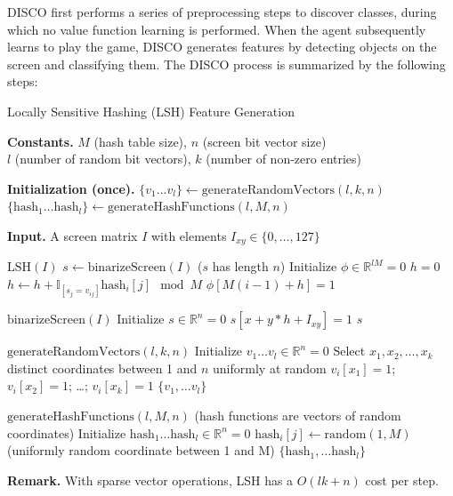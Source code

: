 \documentclass[twoside,11pt]{article}
\newcommand{\bR}{\mathbb{R}}
\newcommand{\indic}[1]{\mathbb{I}_{[#1]}}
\begin{document}
DISCO first performs a series of preprocessing steps to discover classes,
during which no value function learning is performed. When the agent subsequently learns 
to play the game, DISCO generates features by detecting objects on the screen and classifying them. 
The DISCO process is summarized by the following steps:

\begin{algorithm}
\caption{Locally Sensitive Hashing (LSH) Feature Generation\label{algo:lsh_feature_generation}}
\begin{algorithmic}
\item[\textbf{Constants.}] $M$ (hash table size), $n$ (screen bit vector size) \\
  $l$ (number of random bit vectors), $k$ (number of non-zero entries) 
\item[\textbf{Initialization (once).}]
\STATE $\{v_1 \dots v_l \} \gets \text{generateRandomVectors}(l, k, n)$ 
\STATE $\{\text{hash}_1 \dots \text{hash}_l \} \gets \text{generateHashFunctions}(l, M, n)$ 
\STATE
\item[\textbf{Input.}] A screen matrix $I$ with elements $I_{xy} \in \{0, \dots, 127 \}$
\STATE

\item[$\text{LSH}(I)$]
\STATE $s \gets \textrm{binarizeScreen}(I)$ ($s$ has length $n$)
\STATE Initialize $\phi \in \bR^{lM} = 0$ 
  \STATE $h = 0$
    \STATE $h \gets h + \indic{s_j = v_{ij}} \text{hash}_i[j] \mod M$  
  \ENDFOR
  \STATE $\phi[M (i - 1) + h] = 1$ 
\ENDFOR
\STATE
\item[$\text{binarizeScreen}(I)$]
\STATE Initialize $s \in \bR^n = 0$
  \STATE $s[x + y * h + I_{xy}] = 1$
\ENDFOR
\RETURN $s$
\STATE

\item[$\text{generateRandomVectors}(l, k, n)$]
\STATE Initialize $v_1 \dots v_l \in \bR^n = 0$
  \STATE Select $x_1, x_2, \dots, x_k$ distinct coordinates between 1 and $n$ uniformly at random 
  \STATE $v_i[x_1] = 1$; $v_i[x_2] = 1$; \dots ; $v_i[x_k] = 1$
\ENDFOR
\RETURN $\{ v_1, \dots v_l \}$
\STATE

\item[$\text{generateHashFunctions}(l, M, n)$ (hash functions are vectors of random coordinates)]
\STATE Initialize $\text{hash}_1 \dots \text{hash}_l \in \bR^n = 0$
  \STATE $\text{hash}_i[j] \gets \text{random}(1, M)$ (uniformly random coordinate between 1 and M)
\ENDFOR
\RETURN $\{ \text{hash}_1, \dots \text{hash}_l \}$
\STATE
\item[\textbf{Remark.} With sparse vector operations, LSH has a $O(lk + n)$ cost per step.] 

\end{algorithmic}
\end{algorithm}
\end{document}
